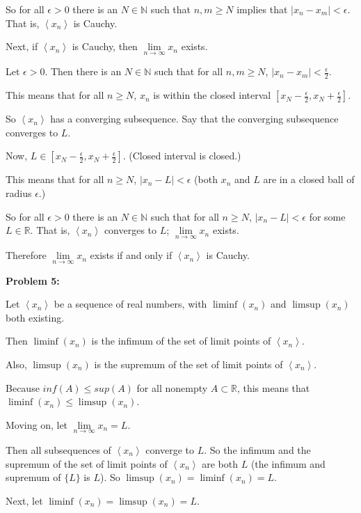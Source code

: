 \documentclass[a4paper,12pt]{article}
\newcommand{\tab}{\hspace{4mm}} %
\newcommand{\shunt}{\vspace{20mm}}
\newcommand{\absval}[1]{\lvert #1 \rvert}
\newcommand{\anbrack}[1]{\left\langle #1 \right\rangle}
\newcommand{\ep}{\epsilon}
\newcommand{\N}{\mathbb{N}}
\newcommand{\R}{\mathbb{R}}
\begin{document}
\tab So for all $\ep >0$ there is an $N \in \N$ such that $n,m \geq N$ implies that $\absval{x_n - x_m} < \ep$. That is, $\anbrack{x_n}$ is Cauchy.

Next, if $\anbrack{x_n}$ is Cauchy, then $\lim\limits_{n \to \infty} x_n$ exists.

\tab Let $\ep >0$. Then there is an $N \in \N$ such that for all $n,m \geq N$, $\absval{x_n - x_m} < \frac{\ep}{2}$.

\tab This means that for all $n \geq N$, $x_n$ is within the closed interval $[x_N - \frac{\ep}{2}, x_N +\frac{\ep}{2}]$.

\tab So $\anbrack{x_n}$ has a converging subsequence. Say that the converging subsequence converges to $L$.

\tab Now, $L \in [x_N - \frac{\ep}{2}, x_N +\frac{\ep}{2}]$. (Closed interval is closed.)

\tab This means that for all $n \geq N$, $\absval{x_n - L} < \ep$ (both $x_n$ and $L$ are in a closed ball of radius $\ep$.)

\tab So for all $\ep >0$ there is an $N \in \N$ such that for all $n \geq N$, $\absval{x_n - L} < \ep$ for some $L \in \R$. That is, $\anbrack{x_n}$ converges to $L$; $\lim\limits_{n \to \infty} x_n$ exists.

Therefore $\lim\limits_{n \to \infty} x_n$ exists if and only if $\anbrack{x_n}$ is Cauchy.

\shunt

{\bf Problem 5:}

Let $\anbrack{x_n}$ be a sequence of real numbers, with $\liminf(x_n)$ and $\limsup(x_n)$ both existing.

Then $\liminf(x_n)$ is the infimum of the set of limit points of $\anbrack{x_n}$.

Also, $\limsup(x_n)$ is the supremum of the set of limit points of $\anbrack{x_n}$.

Because $inf(A) \leq sup(A)$ for all nonempty $A \subset \R$, this means that $\liminf(x_n) \leq \limsup(x_n)$.

Moving on, let $\lim\limits_{n \to \infty} x_n = L$.

\tab Then all subsequences of $\anbrack{x_n}$ converge to $L$. So the infimum and the supremum of the set of limit points of $\anbrack{x_n}$ are both $L$ (the infimum and supremum of $\{L\}$ is $L$). So $\limsup(x_n) = \liminf(x_n) = L$.%

Next, let $\liminf(x_n) = \limsup(x_n) = L$.
\end{document}
